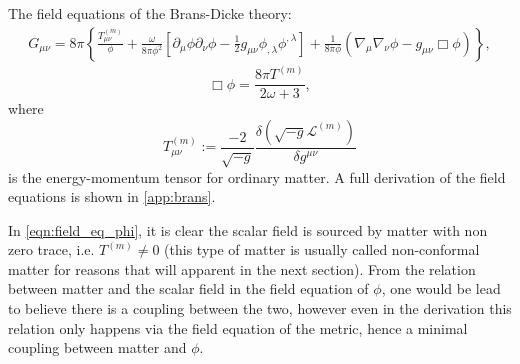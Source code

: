 The field equations of the Brans-Dicke theory:
\begin{align}
G_{\mu\nu}=8\pi\left\{\frac{T_{\mu\nu}^{(m)}}{\phi}+\frac{\omega}{8\pi\phi^2}\left[\partial_\mu \phi \partial_\nu \phi-\frac{1}{2}g_{\mu\nu}\phi_{,\lambda}\phi^{,\lambda}\right]+\frac{1}{8\pi\phi}\left(\nabla_\mu\nabla_\nu\phi-g_{\mu\nu}\Box\phi\right)\right\},
\label{eqn:field_eq_metric}
\end{align}
\begin{equation}
    \Box\phi=\frac{8\pi T^{(m)}}{2\omega+3},
    \label{eqn:field_eq_phi}
\end{equation}
where
\begin{equation}
    T_{\mu\nu}^{(m)} := \frac{-2}{\sqrt{-g}} \frac{\delta\left(\sqrt{-g} \mathcal{L}^{(m)}\right)}{\delta g^{\mu\nu}}
    \label{eqn:def_em_tensor}
\end{equation}
is the energy-momentum tensor for ordinary matter. A full derivation of the field equations is shown in \cref{app:brans}.

In \cref{eqn:field_eq_phi}, it is clear the scalar field is sourced by matter with non zero trace, i.e. $T^{(m)}\neq 0$ (this type of matter is usually called non-conformal matter for reasons that will apparent in the next section). From the relation between matter and the scalar field in the field equation of $\phi$, one would be lead to believe there is a coupling between the two, however even in the derivation this relation only happens via the field equation of the metric, hence a minimal coupling between matter and $\phi$.

